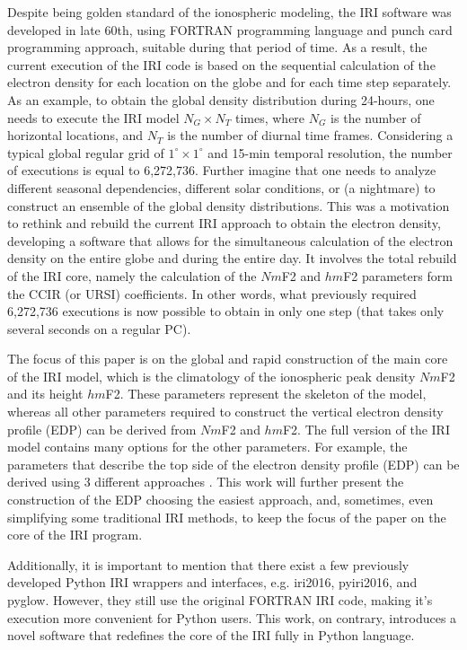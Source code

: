 \documentclass[draft]{agujournal2019}
\begin{document}
Despite being golden standard of the ionospheric modeling, the IRI software was developed in late 60th, using FORTRAN programming language and punch card programming approach, suitable during that period of time. As a result, the current execution of the IRI code is based on the sequential calculation of the electron density for each location on the globe and for each time step separately. As an example, to obtain the global density distribution during 24-hours, one needs to execute the IRI model $N_{G} \times N_{T}$ times, where $N_{G}$ is the number of horizontal locations, and $N_{T}$ is the number of diurnal time frames. Considering a typical global regular grid of $1^{\circ} \times 1^{\circ}$ and 15-min temporal resolution, the number of executions is equal to 6,272,736. Further imagine that one needs to analyze different seasonal dependencies, different solar conditions, or (a nightmare) to construct an ensemble of the global density distributions. This was a motivation to rethink and rebuild the current IRI approach to obtain the electron density, developing a software that allows for the simultaneous calculation of the electron density on the entire globe and during the entire day. It involves the total rebuild of the IRI core, namely the calculation of the $Nm$F2 and $hm$F2 parameters form the CCIR (or URSI) coefficients. In other words, what previously required 6,272,736 executions is now possible to obtain in only one step (that takes only several seconds on a regular PC).  

The focus of this paper is on the global and rapid construction of the main core of the IRI model, which is the climatology of the ionospheric peak density $Nm$F2 and its height $hm$F2. These parameters represent the skeleton of the model, whereas all other parameters required to construct the vertical electron density profile (EDP) can be derived from $Nm$F2 and $hm$F2. The full version of the IRI model contains many options for the other parameters. For example, the parameters that describe the top side of the electron density profile (EDP) can be derived using 3 different approaches \cite{Bil22}. This work will further present the construction of the EDP choosing the easiest approach, and, sometimes, even simplifying some traditional IRI methods, to keep the focus of the paper on the core of the IRI program.  

Additionally, it is important to mention that there exist a few previously developed Python IRI wrappers and interfaces, e.g. iri2016, pyiri2016, and pyglow. However, they still use the original FORTRAN IRI code, making it's execution more convenient for Python users. This work, on contrary, introduces a novel software that redefines the core of the IRI fully in Python language. 
\end{document}
